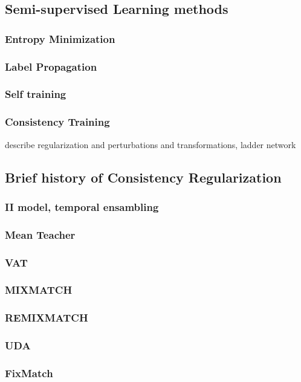 \documentclass[12pt]{article}
\theoremstyle{definition}
\DeclareRobustCommand{\[}{\begin{equation}}
\DeclareRobustCommand{\]}{\end{equation}}
\begin{document}
        \subsection{Semi-supervised Learning methods}
            \subsubsection{Entropy Minimization}
            \subsubsection{Label Propagation}
            \subsubsection{Self training}
            \subsubsection{Consistency Training}
                describe regularization and perturbations and transformations, ladder network
        \subsection{Brief history of Consistency Regularization}
             \subsubsection{II model, temporal ensambling}
             \subsubsection{Mean Teacher}
             \subsubsection{VAT}
             \subsubsection{MIXMATCH}
             \subsubsection{REMIXMATCH}
             \subsubsection{UDA}
             \subsubsection{FixMatch}
                \cite{FixMatch}
             
\end{document}
